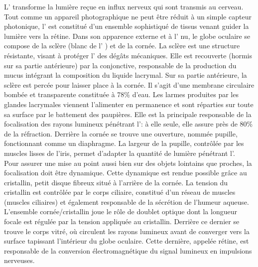 L'\oeil{} transforme la lumière reçue en influx nerveux qui sont transmis au cerveau. Tout comme un appareil photographique ne peut être réduit à un simple capteur photonique, l'\oeil{} est constitué d'un ensemble sophistiqué de tissus venant guider la lumière vers la rétine. Dans son apparence externe et à l'\oeil{} nu, le globe oculaire se compose de la sclère (\og blanc de l'\oeil{}\fg{} ) et de la cornée. La sclère est une structure résistante, visant à protéger l'\oeil{} des dégâts mécaniques. Elle est recouverte (hormis sur sa partie antérieure) par la conjonctive, responsable de la production du mucus intégrant la composition du liquide lacrymal. Sur sa partie antérieure, la sclère est percée pour laisser place à la cornée. Il s'agit d'une membrane circulaire bombée et transparente constituée à 78\% d'eau. Les larmes produites par les glandes lacrymales viennent l'alimenter en permanence et sont réparties sur toute sa surface par le battement des paupières. Elle est la principale responsable de la focalisation des rayons lumineux pénétrant l'\oeil{}: à elle seule, elle assure près de 80\% de la réfraction. Derrière la cornée se trouve une ouverture, nommée pupille, fonctionnant comme un diaphragme. La largeur de la pupille, contrôlée par les muscles lisses de l'iris, permet d'adapter la quantité de lumière pénétrant l'\oeil{}. \\
Pour assurer une mise au point aussi bien sur des objets lointains que proches, la focalisation doit être dynamique. Cette dynamique est rendue possible grâce au cristallin, petit disque fibreux situé à l'arrière de la cornée. La tension du cristallin est contrôlée par le corps ciliaire, constitué d'un réseau de muscles (muscles ciliaires) et également responsable de la sécrétion de l'humeur aqueuse. L'ensemble cornée/cristallin joue le rôle de doublet optique dont la longueur focale est régulée par la tension appliquée au cristallin.
Derrière ce dernier se trouve le corps vitré, où circulent les rayons lumineux avant de converger vers la surface tapissant l'intérieur du globe oculaire. Cette dernière, appelée rétine, est responsable de la conversion électromagnétique du signal lumineux en impulsions nerveuses. 


